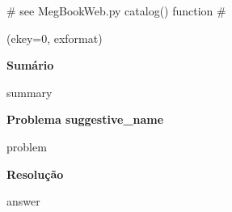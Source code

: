 {# see MegBookWeb.py catalog() function #}


\bigskip

  (ekey=0, {{exformat}})

\textbf{Sumário}

\begin{spverbatim}
{{summary}}
\end{spverbatim}

\textbf{Problema {{suggestive_name}}  }

{{problem}}

\textbf{Resolução}

{{answer}}





